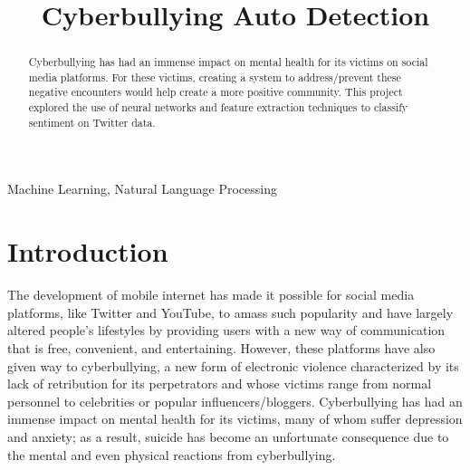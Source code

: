 \documentclass[conference]{IEEEtran}
\begin{document}
\title{Cyberbullying Auto Detection\\}

\author{
\and
{}
}

\maketitle

\begin{abstract}
Cyberbullying has had an immense impact on mental health for its victims on social media platforms. For these victims, creating a system to address/prevent these negative encounters would help create a more positive community. This project explored the use of neural networks and feature extraction techniques to classify sentiment on Twitter data.
\end{abstract}

\begin{IEEEkeywords}
Machine Learning, Natural Language Processing
\end{IEEEkeywords}

\section{Introduction}
The development of mobile internet has made it possible for social media platforms, like Twitter and YouTube, to amass such popularity and have largely altered people’s lifestyles by providing users with a new way of communication that is free, convenient, and entertaining. However, these platforms have also given way to cyberbullying, a new form of electronic violence characterized by its lack of retribution for its perpetrators and whose victims range from normal personnel to celebrities or popular influencers/bloggers. Cyberbullying has had an immense impact on mental health for its victims, many of whom suffer depression and anxiety; as a result, suicide has become an unfortunate consequence due to the mental and even physical reactions from cyberbullying.
\end{document}
